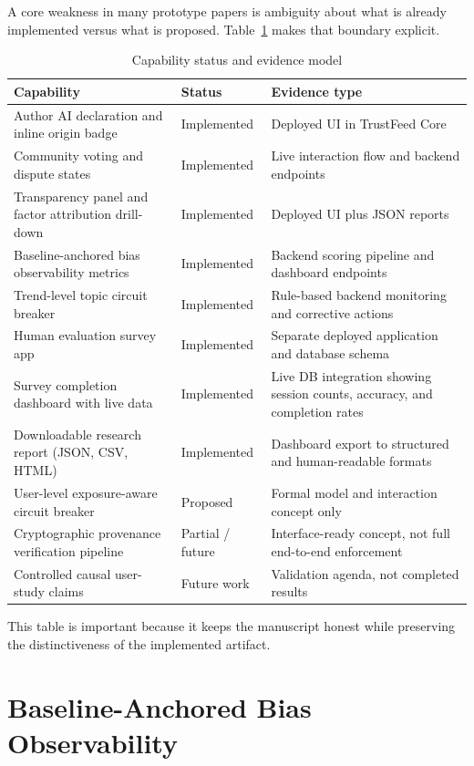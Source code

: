 \documentclass[acmlarge,screen,nonacm]{acmart}
\begin{document}
A core weakness in many prototype papers is ambiguity about what is already implemented versus what is proposed. Table~\ref{tab:status} makes that boundary explicit.

\begin{table}[t]
\caption{Capability status and evidence model}
\label{tab:status}
\begin{tabular}{p{4.2cm}p{2.5cm}p{6.2cm}}
\toprule
\textbf{Capability} & \textbf{Status} & \textbf{Evidence type} \\
\midrule
Author AI declaration and inline origin badge & Implemented & Deployed UI in TrustFeed Core \\
Community voting and dispute states & Implemented & Live interaction flow and backend endpoints \\
Transparency panel and factor attribution drill-down & Implemented & Deployed UI plus JSON reports \\
Baseline-anchored bias observability metrics & Implemented & Backend scoring pipeline and dashboard endpoints \\
Trend-level topic circuit breaker & Implemented & Rule-based backend monitoring and corrective actions \\
Human evaluation survey app & Implemented & Separate deployed application and database schema \\
Survey completion dashboard with live data & Implemented & Live DB integration showing session counts, accuracy, and completion rates \\
Downloadable research report (JSON, CSV, HTML) & Implemented & Dashboard export to structured and human-readable formats \\
User-level exposure-aware circuit breaker & Proposed & Formal model and interaction concept only \\
Cryptographic provenance verification pipeline & Partial / future & Interface-ready concept, not full end-to-end enforcement \\
Controlled causal user-study claims & Future work & Validation agenda, not completed results \\
\bottomrule
\end{tabular}
\end{table}

This table is important because it keeps the manuscript honest while preserving the distinctiveness of the implemented artifact.

\section{Baseline-Anchored Bias Observability}
\end{document}
